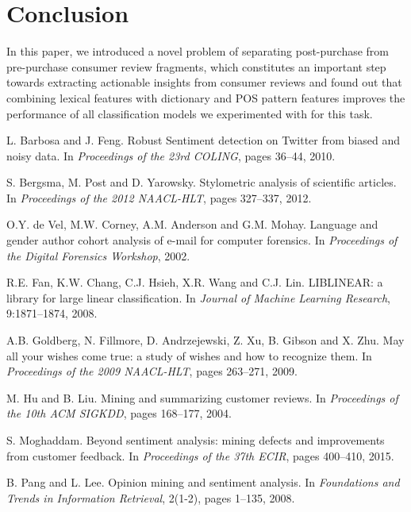 \documentclass[runningheads,a4paper]{llncs}
\begin{document}
\section{Conclusion}

In this paper, we introduced a novel problem of separating post-purchase from pre-purchase consumer review fragments, which constitutes an important step towards extracting
actionable insights from consumer reviews and found out that combining lexical features with dictionary and POS pattern features improves the performance of all classification
models we experimented with for this task.

\begin{thebibliography}{4}
{\scriptsize
{}
L. Barbosa and J. Feng. Robust Sentiment detection on Twitter from biased and noisy data. In \textsl{Proceedings of the 23rd COLING}, pages 36--44, 2010.

S. Bergsma, M. Post and D. Yarowsky. Stylometric analysis of scientific articles. In \textsl{Proceedings of the 2012 NAACL-HLT}, pages 327--337, 2012.

O.Y. de Vel, M.W. Corney, A.M. Anderson and G.M. Mohay. Language and gender author cohort analysis of e-mail for computer forensics. In \textsl{Proceedings of the Digital
Forensics Workshop}, 2002.

R.E. Fan, K.W. Chang, C.J. Hsieh, X.R. Wang and C.J. Lin. LIBLINEAR: a library for large linear classification. In \textsl{Journal of Machine Learning Research}, 9:1871--1874,
2008.

A.B. Goldberg, N. Fillmore, D. Andrzejewski, Z. Xu, B. Gibson and X. Zhu. May all your wishes come true: a study of wishes and how to recognize them. In \textsl{Proceedings of
the 2009 NAACL-HLT}, pages 263--271, 2009.

M. Hu and B. Liu. Mining and summarizing customer reviews. In \textsl{Proceedings of the 10th ACM SIGKDD}, pages 168--177, 2004.

S. Moghaddam. Beyond sentiment analysis: mining defects and improvements from customer feedback. In \textsl{Proceedings of the 37th ECIR}, pages 400--410, 2015.

B. Pang and L. Lee. Opinion mining and sentiment analysis. In \textsl{Foundations and Trends in Information Retrieval}, 2(1-2), pages 1--135, 2008.

}
\end{thebibliography}
\end{document}
